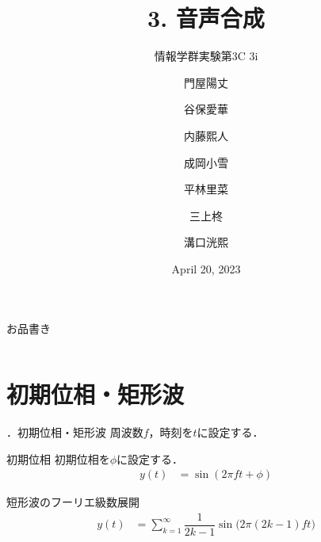 \documentclass[aspectratio=43]{beamer}
\title[音声合成]{3. 音声合成}
\subtitle[]{情報学群実験第3C 3i}
\author[Group 10]{\small 門屋陽丈\and 谷保愛華\and 内藤熙人\and 成岡小雪\and 平林里菜\and 三上柊\and 溝口洸熙}
\institute[]{Group 10}
\date[2023.04.20]{April 20, 2023}
\newcommand{\showsec}{\thesection ．}
\begin{document}
\begin{frame}
    \titlepage
\end{frame}
\begin{frame}{お品書き}
    \begin{columns}[onlytextwidth,T]
        \begin{column}{.5\textwidth}
            \tableofcontents[sections={1-5}]
        \end{column}
        \begin{column}{.5\textwidth}
            \tableofcontents[sections={6-7}]
        \end{column}
    \end{columns}
\end{frame}
\section{初期位相・矩形波}
\begin{frame}[t]{\showsec 初期位相・矩形波}
    周波数\(f\)，時刻を\(t\)に設定する．
    \begin{block}{初期位相}
        初期位相を\(\phi\)に設定する．
        \begin{align}
            y(t) & = \sin(2\pi ft+\phi)
        \end{align}
    \end{block}
    \begin{block}{短形波のフーリエ級数展開}
        \begin{align}
            y(t) & = \sum_{k=1}^{\infty}\dfrac{1}{2k-1}\sin\big(2\pi(2k-1)ft\big)
        \end{align}
    \end{block}
\end{frame}
\end{document}
